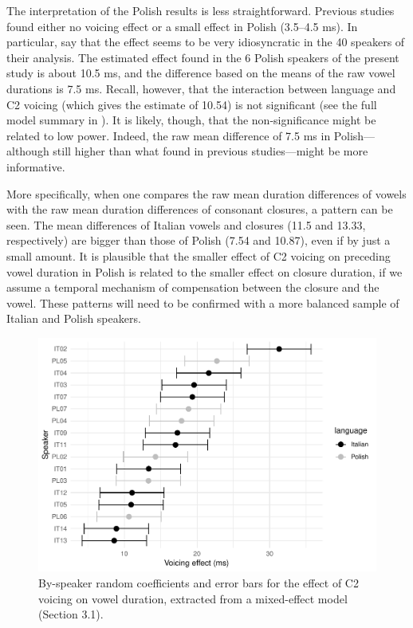 \documentclass[charis]{glossa}
\begin{document}
The interpretation of the Polish results is less straightforward.
Previous studies found either no voicing effect or a small effect in
Polish (3.5--4.5 ms). In particular, \citet{malisz2008} say that the
effect seems to be very idiosyncratic in the 40 speakers of their
analysis. The estimated effect found in the 6 Polish speakers of the
present study is about 10.5 ms, and the difference based on the means of
the raw vowel durations is 7.5 ms. Recall, however, that the interaction
between language and C2 voicing (which gives the estimate of 10.54) is
not significant (see the full model summary in ). It
is likely, though, that the non-significance might be related to low
power. Indeed, the raw mean difference of 7.5 ms in Polish---although
still higher than what found in previous studies---might be more
informative.

More specifically, when one compares the raw mean duration differences
of vowels with the raw mean duration differences of consonant closures,
a pattern can be seen. The mean differences of Italian vowels and
closures (11.5 and 13.33, respectively) are bigger than those of Polish
(7.54 and 10.87), even if by just a small amount. It is plausible that
the smaller effect of C2 voicing on preceding vowel duration in Polish
is related to the smaller effect on closure duration, if we assume a
temporal mechanism of compensation between the closure and the vowel.
These patterns will need to be confirmed with a more balanced sample of
Italian and Polish speakers.

\begin{figure}
\includegraphics[width=\linewidth]{2018-relrel_files/figure-latex/Figure6} \caption{By-speaker random coefficients and error bars for the effect of C2 voicing on vowel duration, extracted from a mixed-effect model (Section 3.1).}\label{f:Figure6}
\end{figure}
\end{document}
